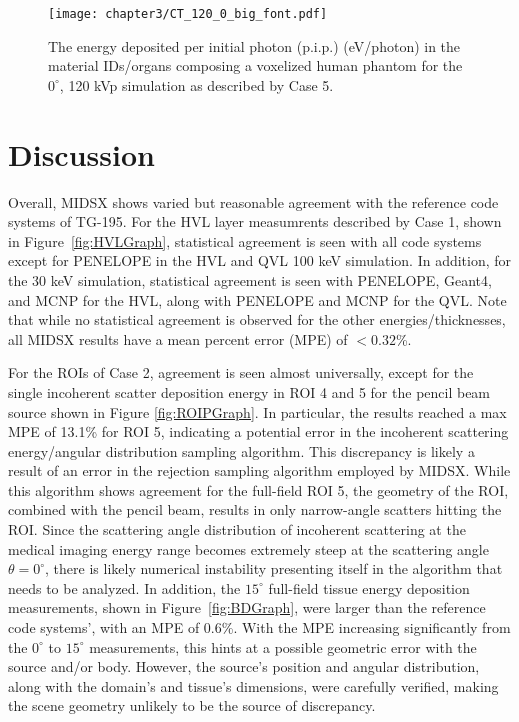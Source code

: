 \begin{figure}[H]
    \centering
	\texttt{[image: chapter3/CT\_120\_0\_big\_font.pdf]}
	\caption{The energy deposited per initial photon (p.i.p.) (eV/photon) in the material IDs/organs composing a voxelized human phantom for the $0^\circ$, 120 kVp simulation as described by Case 5.}
	\label{fig:CTGraph}
\end{figure}

\section{Discussion}
\par Overall, MIDSX shows varied but reasonable agreement with the reference code systems of TG-195. For the HVL layer measumrents described by Case 1, shown in Figure~\ref{fig:HVLGraph}, statistical agreement is seen with all code systems except for PENELOPE in the HVL and QVL 100 keV simulation. In addition, for the 30 keV simulation, statistical agreement is seen with PENELOPE, Geant4, and MCNP for the HVL, along with PENELOPE and MCNP for the QVL. Note that while no statistical agreement is observed for the other energies/thicknesses, all MIDSX results have a mean percent error (MPE) of $<0.32$\%.

\par For the ROIs of Case 2, agreement is seen almost universally, except for the single incoherent scatter deposition energy in ROI 4 and 5 for the pencil beam source shown in Figure \ref{fig:ROIPGraph}. In particular, the results reached a max MPE of 13.1\% for ROI 5, indicating a potential error in the incoherent scattering energy/angular distribution sampling algorithm. This discrepancy is likely a result of an error in the rejection sampling algorithm employed by MIDSX. While this algorithm shows agreement for the full-field ROI 5, the geometry of the ROI, combined with the pencil beam, results in only narrow-angle scatters hitting the ROI. Since the scattering angle distribution of incoherent scattering at the medical imaging energy range becomes extremely steep at the scattering angle $\theta = 0^\circ$, there is likely numerical instability presenting itself in the algorithm that needs to be analyzed. In addition, the $15^\circ$ full-field tissue energy deposition measurements, shown in Figure~\ref{fig:BDGraph}, were larger than the reference code systems', with an MPE of 0.6\%. With the MPE increasing significantly from the $0^\circ$ to $15^\circ$ measurements, this hints at a possible geometric error with the source and/or body. However, the source's position and angular distribution, along with the domain's and tissue's dimensions, were carefully verified, making the scene geometry unlikely to be the source of discrepancy.

